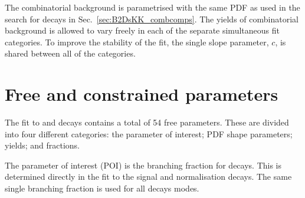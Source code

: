 
The combinatorial background is parametrised with the same PDF as used in the search for \decay{\Bp}{\Dsp\Kp\Km} decays in Sec.~\ref{sec:B2DsKK_combcomps}.
The yields of combinatorial background is allowed to vary freely in each of the separate simultaneous fit categories. To improve the stability of the fit, the single slope parameter, $c$, is shared between all of the categories. 

\section{Free and constrained parameters}

The fit to \decay{\Bp}{\Dsp\phiz} and \decay{\Bp}{\Dsp\Dzb} decays contains a total of 54 free parameters. 
These are divided into four different categories: the parameter of interest; PDF shape parameters; yields; and fractions.



The parameter of interest (POI) is the branching fraction for \decay{\Bp}{\Dsp\phiz} decays. This is determined directly in the fit to the signal and normalisation decays. The same single branching fraction is used for all \Dsp decays modes.

